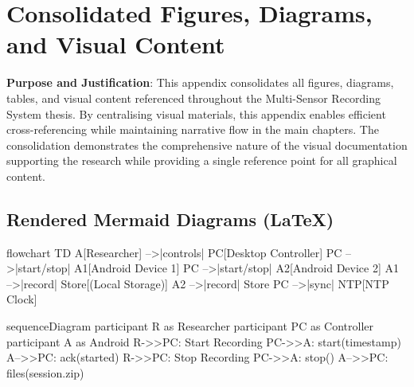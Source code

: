\chapter{Consolidated Figures, Diagrams, and Visual Content}

\textbf{Purpose and Justification}: This appendix consolidates all figures, diagrams, tables, and visual content referenced throughout the Multi-Sensor Recording System thesis. By centralising visual materials, this appendix enables efficient cross-referencing while maintaining narrative flow in the main chapters. The consolidation demonstrates the comprehensive nature of the visual documentation supporting the research while providing a single reference point for all graphical content.



\section*{Rendered Mermaid Diagrams (LaTeX)}

\begin{mermaid}
    flowchart TD
    A[Researcher] -->|controls| PC[Desktop Controller]
    PC -->|start/stop| A1[Android Device 1]
    PC -->|start/stop| A2[Android Device 2]
    A1 -->|record| Store[(Local Storage)]
    A2 -->|record| Store
    PC -->|sync| NTP[NTP Clock]
\end{mermaid}

\begin{mermaid}
    sequenceDiagram
    participant R as Researcher
    participant PC as Controller
    participant A as Android
    R->>PC: Start Recording
    PC->>A: start(timestamp)
    A-->>PC: ack(started)
    R->>PC: Stop Recording
    PC->>A: stop()
    A-->>PC: files(session.zip)
\end{mermaid}

